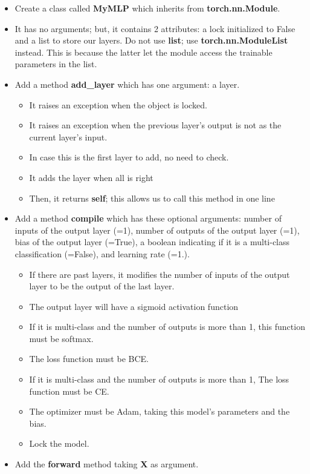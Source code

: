 \documentclass[11pt, a4paper]{article}
\begin{document}
\begin{multicols}{2}
	\begin{itemize}  
		\item Create a class called \textbf{MyMLP} which inherits from \textbf{torch.nn.Module}.
		\item It has no arguments; but, it contains 2 attributes: a lock initialized to False and a list to store our layers. 
		Do not use \textbf{list}; use \textbf{torch.nn.ModuleList} instead. 
		This is because the latter let the module access the trainable parameters in the list.
		\item Add a method \textbf{add\_layer} which has one argument: a layer. 
		\begin{itemize} 
			\item It raises an exception when the object is locked.
			\item It raises an exception when the previous layer's output is not as the current layer's input.
			\item In case this is the first layer to add, no need to check.
			\item It adds the layer when all is right
			\item Then, it returns \textbf{self}; this allows us to call this method in one line 
		\end{itemize}
		\item Add a method \textbf{compile} which has these optional arguments: number of inputs of the output layer (=1), number of outputs of the output layer (=1), bias of the output layer (=True), a boolean indicating if it is a multi-class classification (=False), and learning rate (=1.).
		\begin{itemize} 
			\item If there are past layers, it modifies the number of inputs of the output layer to be the output of the last layer.
			\item The output layer will have a sigmoid activation function
			\item If it is multi-class and the number of outputs is more than 1, this function must be softmax.
			\item The loss function must be BCE.
			\item If it is multi-class and the number of outputs is more than 1, The loss function must be CE.
			\item The optimizer must be Adam, taking this model's parameters and the bias.
			\item Lock the model.
		\end{itemize}
		\item Add the \textbf{forward} method taking \textbf{X} as argument.

\end{itemize}
\end{multicols}
\end{document}

